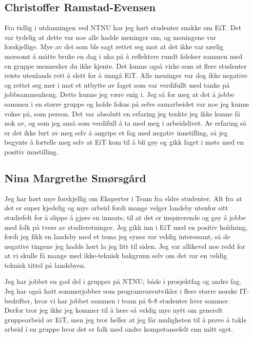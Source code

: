 \subsection*{Christoffer Ramstad-Evensen}
Fra tidlig i utdanningen ved NTNU har jeg hørt studenter snakke om EiT. Det var tydelig at dette var noe alle hadde 
meninger om, og meningene var forskjellige. Mye av det som ble sagt rettet seg mot at det ikke var særlig morsomt 
å måtte bruke en dag i uka på å reflektere rundt følelser sammen med en gruppe mennesker du ikke kjente. Det 
kunne også virke som at flere studenter reiste utenlands rett å slett for å unngå EiT. Alle meninger var dog ikke 
negative og rettet seg mer i mot et utbytte av faget som var verdifullt med tanke på jobbsammenheng. Dette kunne 
jeg være enig i. Jeg så for meg at det å jobbe sammen i en større gruppe og holde fokus på selve samarbeidet var 
noe jeg kunne vokse på, som person. Det var absolutt en erfaring jeg tenkte jeg ikke kunne få nok av, og som jeg 
anså som verdifull å ta med meg i arbeidslivet. Av erfaring så er det ikke lurt av meg selv å angripe et fag med 
negativ innstilling, så jeg begynte å fortelle meg selv at EiT kom til å bli gøy og gikk faget i møte med en positiv 
innstilling.

\subsection*{Nina Margrethe Smørsgård}
Jeg har hørt mye forskjellig om Eksperter i Team fra eldre studenter. Alt fra 
at det er super kjedelig og mye arbeid fordi mange velger landsby utenfor sitt 
studiefelt for å slippe å gjøre en innsats, til at det er inspirerende og gøy 
å jobbe med folk på tvers av studieretninger. Jeg gikk inn i EiT med en positiv 
holdning, fordi jeg fikk en landsby med et tema jeg synes var veldig 
interessant, så de negative tingene jeg hadde hørt la jeg litt til siden. Jeg 
var allikevel noe redd for at vi skulle få mange med ikke-teknisk bakgrunn selv 
om det var en veldig teknisk tittel på landsbyen.

Jeg har jobbet en god del i grupper på NTNU; både i prosjektfag og andre fag.
Jeg har også hatt sommerjobber som programvareutvikler i flere større norske IT-
bedrifter, hvor vi har jobbet sammen i team på 6-8 studenter hver sommer. 
Derfor tror jeg ikke jeg kommer til å lære så veldig mye nytt om generelt 
gruppearbeid av EiT, men jeg tror heller at jeg får muligheten til å prøve å 
takle arbeid i en gruppe hvor det er folk med andre kompetansefelt enn mitt eget.

